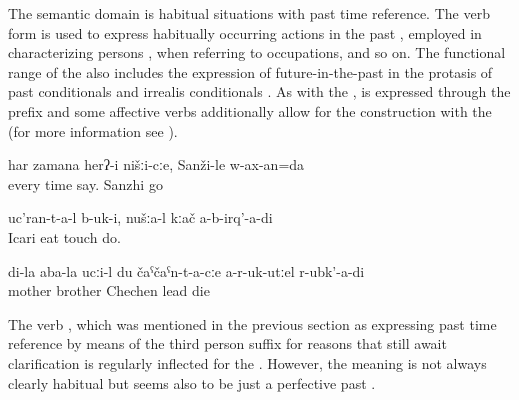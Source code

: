 The semantic domain is habitual situations with past time reference. The verb form is used to express habitually occurring actions in the past , employed in characterizing persons , when referring to occupations, and so on. The functional range of the  also includes the expression of future-in-the-past in the protasis of past conditionals and irrealis conditionals . As with the ,  is expressed through the prefix   and some affective verbs additionally allow for the  construction with the  (for more information see ).
%
\begin{exe}
	\ex	\label{ex:He always told us}
	\gll	har	zamana	herʔ-i	nišːi-cːe,	Sanži-le	w-ax-an=da\\
		every	time	say.		Sanzhi	go\\
	\glt	{}

	\ex	\label{ex:Icari people ate it}
	\gll	uc'ran-t-a-l	b-uk-i,	nušːa-l	kːač	a-b-irq'-a-di\\
		Icari	eat		touch	do.\\
	\glt	{}

	\ex	\label{ex:If my mother's brother would not have brought me to Chechnya}
	\gll	di-la	aba-la	ucːi-l	du	čaˁčaˁn-t-a-cːe	a-r-uk-utːel		r-ubk'-a-di\\
			mother	brother		Chechen	lead	die\\
	\glt	{}

\end{exe}


The verb  , which was mentioned in the previous section as expressing past time reference by means of the third person  suffix for reasons that still await clarification is regularly inflected for the . However, the meaning is not always clearly habitual but seems also to be just a perfective past .

